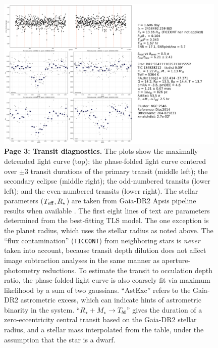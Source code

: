 \documentclass[12pt,twocolumn,tighten]{aastex62}
\begin{document}
\begin{figure}[!h]
	\begin{center}
		\leavevmode
		\includegraphics[width=0.98\textwidth]{gaiatwo0005541111035713815552-0007_page03.pdf}
	\end{center}
	\vspace{-0.5cm}
	\caption{
    {\bf Page 3: Transit diagnostics.} The plots show the
    maximally-detrended light curve (top); the phase-folded light
    curve centered over $\pm3$ transit durations of the primary
    transit (middle left); the secondary eclipse (middle right); the
    odd-numbered transits (lower left); and the even-numbered transits
    (lower right).
    The stellar parameters ($T_{\rm eff}, R_\star$) are taken from
    Gaia-DR2 Apsis pipeline results when available
    \citep{andrae_apsis_2018}.
    The first eight lines of text are parameters determined from the
    best-fitting TLS model.
    The one exception is the planet radius, which uses the stellar
    radius as noted above.
    The ``flux contamination'' (\texttt{TICCONT}) from neighboring
    stars is {\it never} taken into account, because transit depth
    dilution does not affect image subtraction analyses in the same
    manner as aperture-photometry reductions.
    To estimate the transit to occulation depth ratio, the
    phase-folded light curve is also coarsely fit via maximum
    likelihood by a sum of two gaussians.
    ``AstExc'' refers to the Gaia-DR2 astrometric excess, which can
    indicate hints of astrometric binarity in the system.
    ``$R_\star + M_\star \rightarrow T_{b0}$'' gives the duration of a
    zero-eccentricity central transit based on the Gaia-DR2 stellar
    radius, and a stellar mass interpolated from the
    \citet{pecaut_intrinsic_2013} table, under the assumption that the
    star is a dwarf.
		\label{fig:pg3}
	}
\end{figure}
\end{document}
